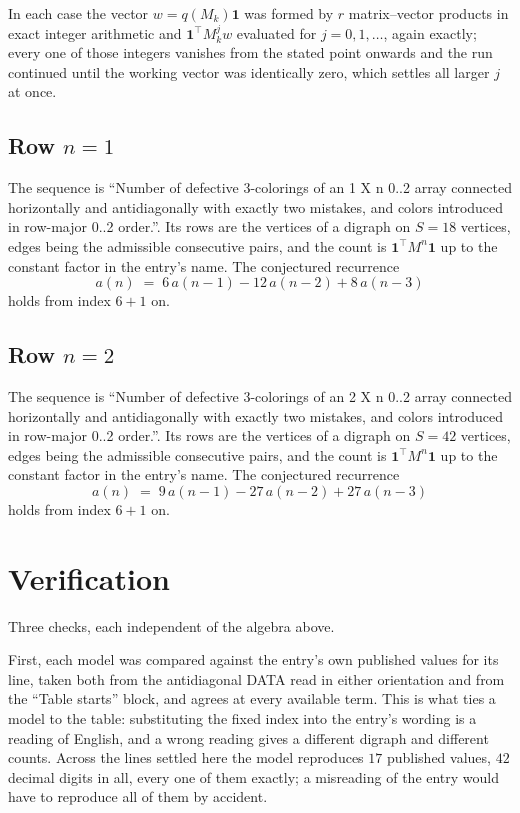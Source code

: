 \documentclass[11pt,a4paper]{article}
\theoremstyle{plain}
\theoremstyle{definition}
\begin{document}
In each case the vector $w=q(M_k)\mathbf{1}$ was formed by $r$ matrix--vector products in
exact integer arithmetic and $\mathbf{1}^{\!\top}M_k^{j}w$ evaluated for $j=0,1,\dots$,
again exactly; every one of those integers vanishes from the stated point onwards and the run
continued until the working vector was identically zero, which settles all larger $j$ at once.

\subsection*{Row $n$$=1$}
The sequence is ``Number of defective 3-colorings of an 1 X n 0..2 array connected horizontally and antidiagonally with exactly two mistakes, and colors introduced in row-major 0..2 order.''. Its rows are the vertices of a digraph on
$S=18$ vertices, edges being the admissible consecutive pairs, and the count is
$\mathbf{1}^{\!\top}M^{n}\mathbf{1}$ up to the constant factor in the entry's name.
The conjectured recurrence
\[
a(n)\;=\;6\,a(n-1) - 12\,a(n-2) + 8\,a(n-3)
\]
holds from index $6+1$ on.

\subsection*{Row $n$$=2$}
The sequence is ``Number of defective 3-colorings of an 2 X n 0..2 array connected horizontally and antidiagonally with exactly two mistakes, and colors introduced in row-major 0..2 order.''. Its rows are the vertices of a digraph on
$S=42$ vertices, edges being the admissible consecutive pairs, and the count is
$\mathbf{1}^{\!\top}M^{n}\mathbf{1}$ up to the constant factor in the entry's name.
The conjectured recurrence
\[
a(n)\;=\;9\,a(n-1) - 27\,a(n-2) + 27\,a(n-3)
\]
holds from index $6+1$ on.

\section{Verification}

Three checks, each independent of the algebra above.

First, each model was compared against the entry's own published values for its line, taken
both from the antidiagonal DATA read in either orientation and from the ``Table starts''
block, and agrees at every available term. This is what ties a model to the table:
substituting the fixed index into the entry's wording is a reading of English, and a wrong
reading gives a different digraph and different counts. Across the lines settled here the
model reproduces $17$ published values, $42$ decimal digits in all, every one of
them exactly; a misreading of the entry would have to reproduce all of them by accident.
\end{document}
